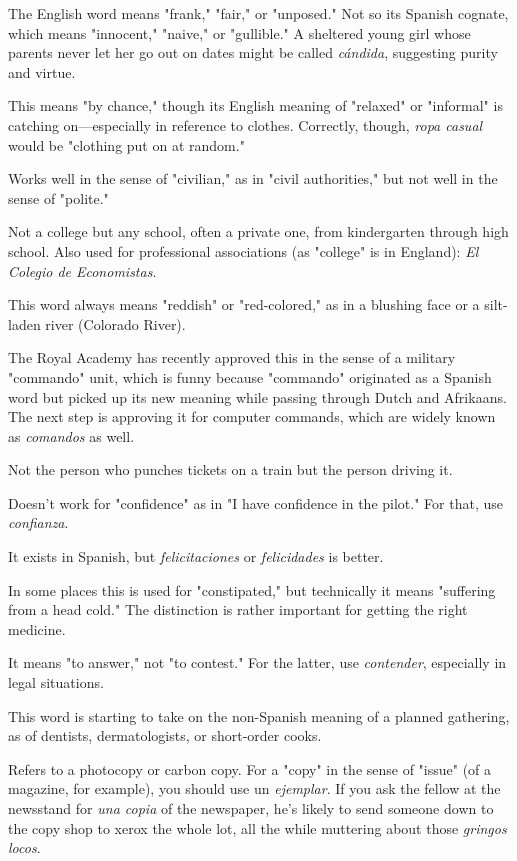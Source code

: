  The English word means "frank," "fair," or "unposed." Not so its Spanish cognate, which means "innocent," "naive,"
or "gullible." A sheltered young girl whose parents never let her go out
on dates might be called \emph{cándida}, suggesting purity and virtue.

 This means "by chance," though its English meaning of "relaxed" or "informal" is catching on---especially in reference
to clothes. Correctly, though, \emph{ropa casual} would be "clothing put on at
random."

 Works well in the sense of "civilian," as in "civil authorities," but not well in the sense of "polite."

 Not a college but any school, often a private one,
from kindergarten through high school. Also used for professional associations (as "college" is in England): \emph{El Colegio de Economistas}.

 This word always means "reddish" or "red-colored," as in a blushing face or a silt-laden river (Colorado River).

 The Royal Academy has recently approved this in
the sense of a military "commando" unit, which is funny because "commando" originated as a Spanish word but picked up its new meaning
while passing through Dutch and Afrikaans. The next step is approving it for computer commands, which are widely known as \emph{comandos}
as well.

 Not the person who punches tickets on a train
but the person driving it.

 Doesn't work for "confidence" as in "I have
confidence in the pilot." For that, use \emph{confianza}.

 It exists in Spanish, but \emph{felicitaciones}
or \emph{felicidades} is better.

 In some places this is used for "constipated,"
but technically it means "suffering from a head cold." The distinction
is rather important for getting the right medicine.

 It means "to answer," not "to contest." For the
latter, use \emph{contender}, especially in legal situations.

 This word is starting to take on the non-Spanish meaning of a planned gathering, as of dentists, dermatologists, or short-order cooks.

 Refers to a photocopy or carbon copy. For a "copy" in
the sense of "issue" (of a magazine, for example), you should use un
\emph{ejemplar}. If you ask the fellow at the newsstand for \emph{una copia} of the
newspaper, he's likely to send someone down to the copy shop to
xerox the whole lot, all the while muttering about those \emph{gringos
locos}.

